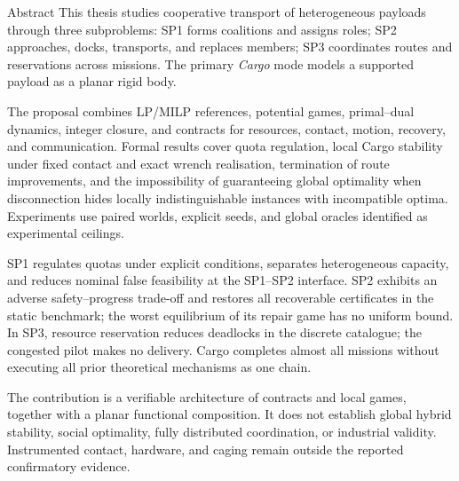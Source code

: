 \begin{viuabstract}{Abstract}
This thesis studies cooperative transport of heterogeneous payloads through
three subproblems: SP1 forms coalitions and assigns roles; SP2 approaches,
docks, transports, and replaces members; SP3 coordinates routes and
reservations across missions. The primary \emph{Cargo} mode models a supported
payload as a planar rigid body.

The proposal combines LP/MILP references, potential games, primal--dual
dynamics, integer closure, and contracts for resources, contact, motion,
recovery, and communication. Formal results cover quota regulation, local Cargo
stability under fixed contact and exact wrench realisation, termination of route
improvements, and the impossibility of guaranteeing global optimality when
disconnection hides locally indistinguishable instances with incompatible optima. Experiments use paired worlds, explicit seeds, and global
oracles identified as experimental ceilings.

SP1 regulates quotas under explicit conditions, separates heterogeneous
capacity, and reduces nominal false feasibility at the SP1--SP2 interface. SP2 exhibits an adverse
safety--progress trade-off and restores all recoverable certificates in the
static benchmark; the worst equilibrium of its repair game has no uniform
bound. In SP3, resource reservation reduces
deadlocks in the discrete catalogue; the congested pilot makes no delivery. Cargo
completes almost all missions without executing all prior theoretical
mechanisms as one chain.

The contribution is a verifiable architecture of contracts and local games,
together with a planar functional composition. It does not establish global
hybrid stability, social optimality, fully distributed coordination, or
industrial validity. Instrumented contact, hardware, and caging remain outside
the reported confirmatory evidence.

\end{viuabstract}

\clearpage
